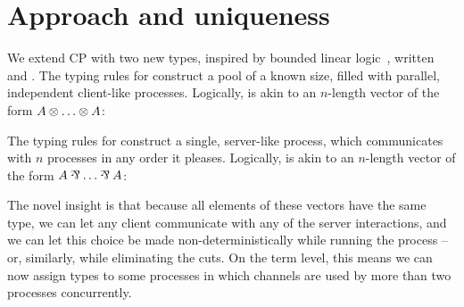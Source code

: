 \documentclass[a4paper,UKenglish]{article}
\begin{document}
\section*{Approach and uniqueness}
We extend CP with two new types, inspired by bounded linear
logic~\cite{girard1992}, written  and . The typing
rules for  construct a pool of a known size, filled with parallel,
independent client-like processes. Logically,  is akin to an
$n$-length vector of the form $A \llTens\dots\llTens A$:
\begin{center}
  \begin{prooftree*}
    \SYM{\llTake[1]{}}
  \end{prooftree*}%
  \begin{prooftree*}
  \end{prooftree*}
\end{center}
The typing rules for  construct a single, server-like process,
which communicates with $n$ processes in any order it pleases. Logically,
 is akin to an $n$-length vector of the form $A \llParr\dots\llParr A$: 
\begin{center}
  \begin{prooftree*}
    \SYM{\llGive[1]{}}
  \end{prooftree*}%
  \begin{prooftree*}
  \end{prooftree*}
\end{center}
The novel insight is that because all elements of these vectors have the same
type, we can let any client communicate with any of the server interactions, and
we can let this choice be made non-deterministically while running the process
-- or, similarly, while eliminating the cuts.
On the term level, this means we can now assign types to some processes in which
channels are used by more than two processes concurrently.
\end{document}

